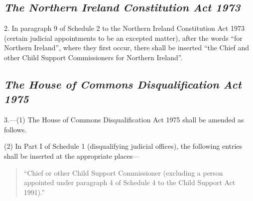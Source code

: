 \documentclass[12pt,a4paper]{article}
\begin{document}
\renewcommand\parthead{--- Schedule 5}


%
%
%
%

\subsection*{\itshape The Northern Ireland Constitution Act 1973}

2. In paragraph 9 of Schedule 2 to the Northern Ireland Constitution Act 1973 (certain judicial appointments to be an excepted matter), after the words “for Northern Ireland”, where they first occur, there shall be inserted “the Chief and other Child Support Commissioners for Northern Ireland”.

\subsection*{\itshape The House of Commons Disqualification Act 1975}

3.---(1) The House of Commons Disqualification Act 1975 shall be amended as follows.

(2) In Part I 
of Schedule 1  %
(disqualifying judicial offices), the following entries shall be inserted at the appropriate places— 
\begin{quotation}
“Chief or other Child Support Commissioner (excluding a person appointed under paragraph 4 of Schedule 4 to the Child Support Act 1991).''
\end{quotation}
\end{document}
